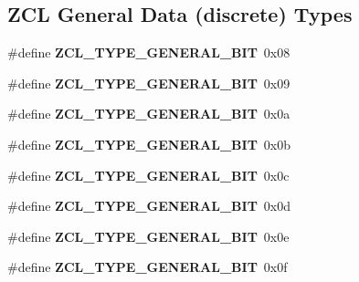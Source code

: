 \subsection*{Z\-C\-L General Data (discrete) Types}
\begin{DoxyCompactItemize}
\item 
\hypertarget{group__zcl__types_gacde7d69b6b6930a192a03dd95548a402}{\#define {\bfseries Z\-C\-L\-\_\-\-T\-Y\-P\-E\-\_\-\-G\-E\-N\-E\-R\-A\-L\-\_\-B\-I\-T}~0x08}\label{group__zcl__types_gacde7d69b6b6930a192a03dd95548a402}

\item 
\hypertarget{group__zcl__types_ga9eba3bb33af0080097578430a8b49fc3}{\#define {\bfseries Z\-C\-L\-\_\-\-T\-Y\-P\-E\-\_\-\-G\-E\-N\-E\-R\-A\-L\-\_\-B\-I\-T}~0x09}\label{group__zcl__types_ga9eba3bb33af0080097578430a8b49fc3}

\item 
\hypertarget{group__zcl__types_gae5e7ea67aa04595d9d73da5f64f71a52}{\#define {\bfseries Z\-C\-L\-\_\-\-T\-Y\-P\-E\-\_\-\-G\-E\-N\-E\-R\-A\-L\-\_\-B\-I\-T}~0x0a}\label{group__zcl__types_gae5e7ea67aa04595d9d73da5f64f71a52}

\item 
\hypertarget{group__zcl__types_ga63038284c953826853ba8747a82baa91}{\#define {\bfseries Z\-C\-L\-\_\-\-T\-Y\-P\-E\-\_\-\-G\-E\-N\-E\-R\-A\-L\-\_\-B\-I\-T}~0x0b}\label{group__zcl__types_ga63038284c953826853ba8747a82baa91}

\item 
\hypertarget{group__zcl__types_gab9b38a5f9e53db715ce6da47fee7982e}{\#define {\bfseries Z\-C\-L\-\_\-\-T\-Y\-P\-E\-\_\-\-G\-E\-N\-E\-R\-A\-L\-\_\-B\-I\-T}~0x0c}\label{group__zcl__types_gab9b38a5f9e53db715ce6da47fee7982e}

\item 
\hypertarget{group__zcl__types_ga11e0d3943fb5db53a13a8612a9ac99a8}{\#define {\bfseries Z\-C\-L\-\_\-\-T\-Y\-P\-E\-\_\-\-G\-E\-N\-E\-R\-A\-L\-\_\-B\-I\-T}~0x0d}\label{group__zcl__types_ga11e0d3943fb5db53a13a8612a9ac99a8}

\item 
\hypertarget{group__zcl__types_ga320d8cfb4b5674d25770ae6e7181b0fb}{\#define {\bfseries Z\-C\-L\-\_\-\-T\-Y\-P\-E\-\_\-\-G\-E\-N\-E\-R\-A\-L\-\_\-B\-I\-T}~0x0e}\label{group__zcl__types_ga320d8cfb4b5674d25770ae6e7181b0fb}

\item 
\hypertarget{group__zcl__types_ga09599455943165aa8436142254c798da}{\#define {\bfseries Z\-C\-L\-\_\-\-T\-Y\-P\-E\-\_\-\-G\-E\-N\-E\-R\-A\-L\-\_\-B\-I\-T}~0x0f}\label{group__zcl__types_ga09599455943165aa8436142254c798da}

\end{DoxyCompactItemize}
